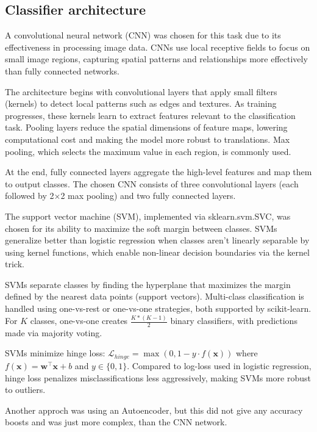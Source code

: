 \documentclass[a4, 10 pt, conference]{ieeeconf}  %
\begin{document}
\subsection{Classifier architecture}
\label{subsec:architecture}

A convolutional neural network (CNN) was chosen for this task due to its effectiveness in processing image data. CNNs use local receptive fields to focus on small image regions, capturing spatial patterns and relationships more effectively than fully connected networks.

The architecture begins with convolutional layers that apply small filters (kernels) to detect local patterns such as edges and textures. As training progresses, these kernels learn to extract features relevant to the classification task. Pooling layers reduce the spatial dimensions of feature maps, lowering computational cost and making the model more robust to translations. Max pooling, which selects the maximum value in each region, is commonly used.

At the end, fully connected layers aggregate the high-level features and map them to output classes. The chosen CNN consists of three convolutional layers (each followed by 2×2 max pooling) and two fully connected layers.

The support vector machine (SVM), implemented via sklearn.svm.SVC, was chosen for its ability to maximize the soft margin between classes. SVMs generalize better than logistic regression when classes aren't linearly separable by using kernel functions, which enable non-linear decision boundaries via the kernel trick.

SVMs separate classes by finding the hyperplane that maximizes the margin defined by the nearest data points (support vectors). Multi-class classification is handled using one-vs-rest or one-vs-one strategies, both supported by scikit-learn. For $K$ classes, one-vs-one creates $\frac{K*(K-1)}{2}$ binary classifiers, with predictions made via majority voting.

SVMs minimize hinge loss: $\mathcal{L}_{hinge} = \max(0, 1 - y \cdot f(\mathbf{x})) $
where $f(\mathbf{x}) = \mathbf{w}^\top \mathbf{x} + b$ and $y \in \{0, 1\}$. Compared to log-loss used in logistic regression, hinge loss penalizes misclassifications less aggressively, making SVMs more robust to outliers.

Another approch was using an Autoencoder, but this did not give any accuracy boosts and was just more complex, than the CNN network.
\end{document}
